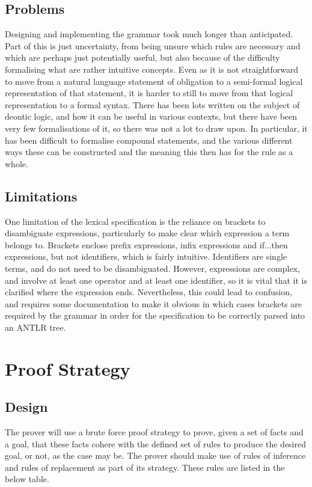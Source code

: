 \documentclass{l4proj}
\begin{document}
\subsection{Problems}
Designing and implementing the grammar took much longer than anticipated. Part of this is just uncertainty, from being unsure which rules are necessary and which are perhaps just potentially useful, but also because of the difficulty formalising what are rather intuitive concepts. Even as it is not straightforward to move from a natural language statement of obligation to a semi-formal logical representation of that statement, it is harder to still to move from that logical representation to a formal syntax. There has been lots written on the subject of deontic logic, and how it can be useful in various contexts, but there have been very few formalisations of it, so there was not a lot to draw upon. In particular, it has been difficult to formalise compound statements, and the various different ways these can be constructed and the meaning this then has for the rule as a whole.

\subsection{Limitations}
One limitation of the lexical specification is the reliance on brackets to disambiguate expressions, particularly to make clear which expression a term belongs to. Brackets enclose prefix expressions, infix expressions and if...then expressions, but not identifiers, which is fairly intuitive. Identifiers are single terms, and do not need to be disambiguated. However, expressions are complex, and involve at least one operator and at least one identifier, so it is vital that it is clarified where the expression ends. Nevertheless, this could lead to confusion, and requires some documentation to make it obvious in which cases brackets are required by the grammar in order for the specification to be correctly parsed into an ANTLR tree. 

\section{Proof Strategy}


\subsection{Design}
The prover will use a brute force proof strategy to prove, given a set of facts and a goal, that these facts cohere with the defined set of rules to produce the desired goal, or not, as the case may be. The prover should make use of rules of inference and rules of replacement as part of its strategy. These rules are listed in the below table\cite{infrules}. 
\end{document}
